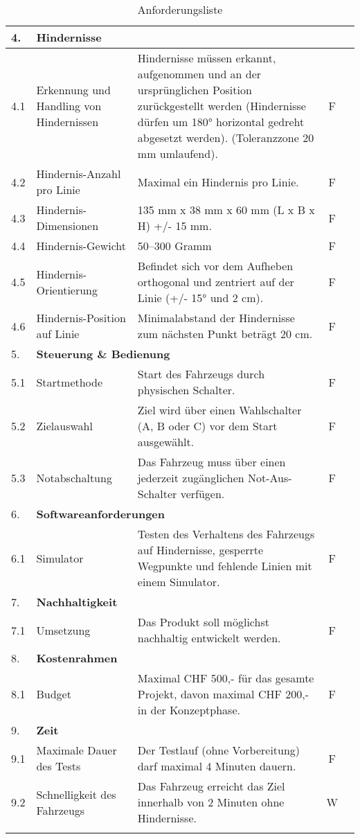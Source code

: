 \documentclass[../main.tex]{subfiles}
\begin{document}
\begin{longtable}[]{@{}lp{4.5cm}p{7.5cm}cc}
  4.  & \multicolumn{4}{l}{\textbf{Hindernisse}} \\ \hline
  4.1 & Erkennung und Handling von Hindernissen & Hindernisse müssen erkannt, aufgenommen und an der ursprünglichen Position zurückgestellt werden (Hindernisse dürfen um 180° horizontal gedreht abgesetzt werden). (Toleranzzone 20 mm umlaufend). & F\\ \hline
  4.2 & Hindernis-Anzahl pro Linie & Maximal ein Hindernis pro Linie. & F\\ \hline
  4.3 & Hindernis-Dimensionen & 135 mm x 38 mm x 60 mm (L x B x H) +/- 15 mm. & F  \\ \hline
  4.4 & Hindernis-Gewicht & 50–300 Gramm & F \\ \hline
  4.5 & Hindernis-Orientierung & Befindet sich vor dem Aufheben orthogonal und zentriert auf der Linie (+/- 15° und 2 cm). & F \\ \hline
  4.6 & Hindernis-Position auf Linie & Minimalabstand der Hindernisse zum nächsten Punkt beträgt 20 cm. & F \\ \hline

  5. & \multicolumn{4}{l}{\textbf{Steuerung \& Bedienung}} \\ \hline
  5.1 & Startmethode & Start des Fahrzeugs durch physischen Schalter. & F \\ \hline
  5.2 & Zielauswahl & Ziel wird über einen Wahlschalter (A, B oder C) vor dem Start ausgewählt. & F  \\ \hline
  5.3 & Notabschaltung & Das Fahrzeug muss über einen jederzeit zugänglichen Not-Aus-Schalter verfügen. & F  \\ \hline

  6.  & \multicolumn{4}{l}{\textbf{Softwareanforderungen}} \\ \hline
  6.1 & Simulator & Testen des Verhaltens des Fahrzeugs auf Hindernisse, gesperrte Wegpunkte und fehlende Linien mit einem Simulator. & F  \\ \hline

  7.  & \multicolumn{4}{l}{\textbf{Nachhaltigkeit}} \\ \hline
  7.1 & Umsetzung & Das Produkt soll möglichst nachhaltig entwickelt werden. & F  \\ \hline

  8.  & \multicolumn{4}{l}{\textbf{Kostenrahmen}} \\ \hline
  8.1 & Budget & Maximal CHF 500,- für das gesamte Projekt, davon maximal CHF 200,- in der Konzeptphase. & F \\ \hline
  
  9.  & \multicolumn{4}{l}{\textbf{Zeit}} \\ \hline
  9.1 & Maximale Dauer des Tests & Der Testlauf (ohne Vorbereitung) darf maximal 4 Minuten dauern. & F \\ \hline
  9.2 & Schnelligkeit des Fahrzeugs & Das Fahrzeug erreicht das Ziel innerhalb von 2 Minuten ohne Hindernisse. & W  \\ \hline

\caption{Anforderungsliste}
\label{tab:Anforderungsliste}
\end{longtable}
\end{document}
